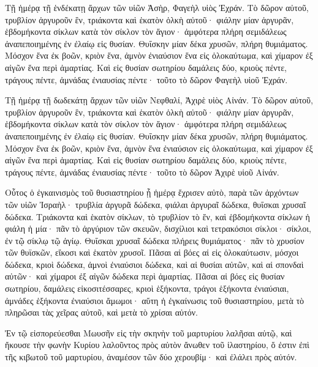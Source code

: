 {\par }{\PP {}Τῇ ἡμέρᾳ τῇ ἑνδέκατῃ ἄρχων τῶν υἱῶν Ἀσὴρ, Φαγεὴλ υἱὸς Ἐχράν.
Τὸ δῶρον αὐτοῦ, τρυβλίον ἀργυροῦν ἓν, τριάκοντα καὶ ἑκατὸν ὁλκὴ αὐτοῦ· φιάλην μίαν ἀργυρᾶν, ἑβδομήκοντα σίκλων κατὰ τὸν σίκλον τὸν ἅγιον· ἀμφότερα πλήρη σεμιδάλεως ἀναπεποιημένης ἐν ἐλαίῳ εἰς θυσίαν.
Θυΐσκην μίαν δέκα χρυσῶν, πλήρη θυμιάματος.
Μόσχον ἕνα ἐκ βοῶν, κριὸν ἕνα, ἀμνὸν ἐνιαύσιον ἕνα εἰς ὁλοκαύτωμα,
καὶ χίμαρον ἐξ αἰγῶν ἕνα περὶ ἁμαρτίας.
Καὶ εἰς θυσίαν σωτηρίου δαμάλεις δύο, κριοὺς πέντε, τράγους πέντε, ἀμνάδας ἐνιαυσίας πέντε· τοῦτο τὸ δῶρον Φαγεὴλ υἱοῦ Ἐχράν.
\par }{\PP {}Τῇ ἡμέρᾳ τῇ δωδεκάτῃ ἄρχων τῶν υἱῶν Νεφθαλί, Ἀχιρὲ υἱὸς Αἰνάν.
Τὸ δῶρον αὐτοῦ, τρυβλίον ἀργυροῦν ἓν, τριάκοντα καὶ ἑκατὸν ὁλκὴ αὐτοῦ· φιάλην μίαν ἀργυρᾶν, ἑβδομήκοντα σίκλων κατὰ τὸν σίκλον τὸν ἅγιον· ἀμφότερα πλήρη σεμιδάλεως ἀναπεποιημένης ἐν ἐλαίῳ εἰς θυσίαν.
Θυΐσκην μίαν δέκα χρυσῶν, πλήρη θυμιάματος.
Μόσχον ἕνα ἐκ βοῶν, κριὸν ἕνα, ἀμνὸν ἕνα ἐνιαύσιον εἰς ὁλοκαύτωμα,
καὶ χίμαρον ἐξ αἰγῶν ἕνα περὶ ἁμαρτίας.
Καὶ εἰς θυσίαν σωτηρίου δαμάλεις δύο, κριοὺς πέντε, τράγους πέντε, ἀμνάδας ἐνιαυσίας πέντε· τοῦτο τὸ δῶρον Ἀχιρὲ υἱοῦ Αἰνάν.
\par }{\PP {}Οὗτος ὁ ἐγκαινισμὸς τοῦ θυσιαστηρίου ᾗ ἡμέρᾳ ἔχρισεν αὐτὸ, παρὰ τῶν ἀρχόντων τῶν υἱῶν Ἰσραὴλ· τρυβλία ἀργυρᾶ δώδεκα, φιάλαι ἀργυραῖ δώδεκα, θυΐσκαι χρυσαῖ δώδεκα.
Τριάκοντα καὶ ἑκατὸν σίκλων, τὸ τρυβλίον τὸ ἕν, καὶ ἑβδομήκοντα σίκλων ἡ φιάλη ἡ μία· πᾶν τὸ ἀργύριον τῶν σκευῶν, δισχίλιοι καὶ τετρακόσιοι σίκλοι· σίκλοι, ἐν τῷ σίκλῳ τῷ ἁγίῳ.
Θυΐσκαι χρυσαῖ δώδεκα πλήρεις θυμιάματος· πᾶν τὸ χρυσίον τῶν θυϊσκῶν, εἴκοσι καὶ ἑκατὸν χρυσοῖ.
Πᾶσαι αἱ βόες αἱ εἰς ὁλοκαύτωσιν, μόσχοι δώδεκα, κριοὶ δώδεκα, ἀμνοὶ ἐνιαύσιοι δώδεκα, καὶ αἱ θυσίαι αὐτῶν, καὶ αἱ σπονδαὶ αὐτῶν· καὶ χίμαροι ἐξ αἰγῶν δώδεκα περὶ ἁμαρτίας.
Πᾶσαι αἱ βόες εἰς θυσίαν σωτηρίου, δαμάλεις εἰκοσιτέσσαρες, κριοὶ ἑξήκοντα, τράγοι ἑξήκοντα ἐνιαύσιαι, ἀμνάδες ἑξήκοντα ἐνιαύσιοι ἄμωμοι· αὕτη ἡ ἐγκαίνωσις τοῦ θυσιαστηρίου, μετὰ τὸ πληρῶσαι τὰς χεῖρας αὐτοῦ, καὶ μετὰ τὸ χρίσαι αὐτόν.
\par }{\PP {}Ἐν τῷ εἰσπορεύεσθαι Μωυσῆν εἰς τὴν σκηνὴν τοῦ μαρτυρίου λαλῆσαι αὐτῷ, καὶ ἤκουσε τὴν φωνὴν Κυρίου λαλοῦντος πρὸς αὐτὸν ἄνωθεν τοῦ ἱλαστηρίου, ὅ ἐστιν ἐπὶ τῆς κιβωτοῦ τοῦ μαρτυρίου, ἀναμέσον τῶν δύο χερουβίμ· καὶ ἐλάλει πρὸς αὐτόν.

}
